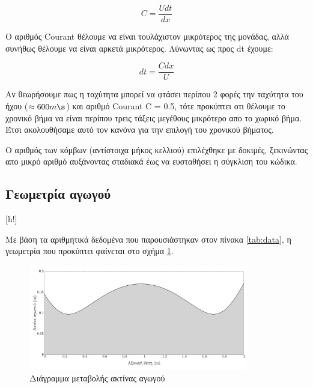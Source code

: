 \begin{equation*}
   C = \dfrac{Udt}{dx} 
\end{equation*}

Ο αριθμός Courant θέλουμε να είναι τουλάχιστον μικρότερος της μονάδας, αλλά συνήθως θέλουμε να είναι αρκετά μικρότερος. Λύνωντας ως προς dt έχουμε:

$$ dt = \dfrac{Cdx}{U}$$

Αν θεωρήσουμε πως η ταχύτητα μπορεί να φτάσει περίπου 2 φορές την ταχύτητα του ήχου ($\approx 600m\s$) και αριθμό Courant C = 0.5, τότε προκύπτει οτι θέλουμε το χρονικό βήμα να είναι περίπου τρεις τάξεις μεγέθους μικρότερο απο το χωρικό βήμα. Έτσι ακολουθήσαμε αυτό τον κανόνα για την επιλογή του χρονικού βήματος.

Ο αριθμός των κόμβων (αντίστοιχα μήκος κελλιού) επιλέχθηκε με δοκιμές, ξεκινώντας απο μικρό αριθμό αυξάνοντας σταδιακά έως να ευσταθήσει η σύγκλιση του κώδικα.


\subsection{Γεωμετρία αγωγού}[h!]

Με βάση τα αριθμητικά δεδομένα που παρουσιάστηκαν στον πίνακα \ref{tab:data}, η γεωμετρία που προκύπτει φαίνεται στο σχήμα \ref{fig:geometry}.

\begin{figure}[h!]
    \begin{center}
        \includegraphics[width=0.85\textwidth]{figures/tube_diam.pdf}
    \end{center}
    \caption{Διάγραμμα μεταβολής ακτίνας αγωγού}
    \label{fig:geometry}
\end{figure}


